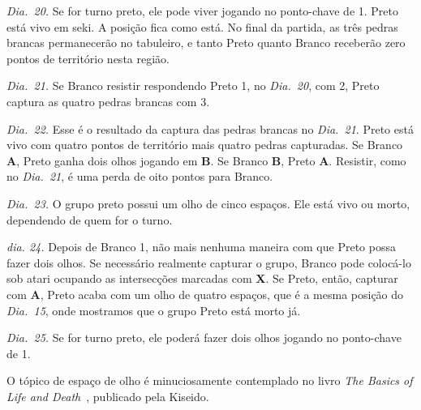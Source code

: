 \emph{Dia.\@~20.} Se for turno preto, ele pode viver jogando no ponto-chave de 1. Preto está vivo em seki. A posição fica como está. No final da partida, as três pedras brancas permanecerão no tabuleiro, e tanto Preto quanto Branco receberão zero pontos de território nesta região.

\emph{Dia.\@~21.} Se Branco resistir respondendo Preto 1, no \emph{Dia.\@~20}, com 2, Preto captura as quatro pedras brancas com 3.

\emph{Dia.\@~22.} Esse é o resultado da captura das pedras brancas no \emph{Dia.\@~21}. Preto está vivo com quatro pontos de território mais quatro pedras capturadas. Se Branco \textbf{A}, Preto ganha dois olhos jogando em \textbf{B}. Se Branco \textbf{B}, Preto \textbf{A}. Resistir, como no \emph{Dia.\@~21}, é uma perda de oito pontos para Branco.

\emph{Dia.\@~23.} O grupo preto possui um olho de cinco espaços. Ele está vivo ou morto, dependendo de quem for o turno.

\emph{dia. 24.} Depois de Branco 1, não mais nenhuma maneira com que Preto possa fazer dois olhos. Se necessário realmente capturar o grupo, Branco pode colocá-lo sob atari ocupando as intersecções marcadas com \textbf{X}. Se Preto, então, capturar com \textbf{A}, Preto acaba com um olho de quatro espaços, que é a mesma posição do \emph{Dia.\@~15}, onde mostramos que o grupo Preto está morto já.

\emph{Dia.\@~25.} Se for turno preto, ele poderá fazer dois olhos jogando no ponto-chave de 1.

O tópico de espaço de olho é minuciosamente contemplado no livro \emph{The Basics of Life and Death}~\cite{zeijst_bozulich_basics_of_life_and_death}, publicado pela Kiseido.